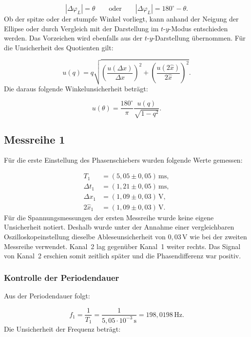 \documentclass{report}
\begin{document}
\begin{equation}
|\Delta\varphi_L|=\theta
\qquad\text{oder}\qquad
|\Delta\varphi_L|=180^\circ-\theta.
\end{equation}
\noindent
Ob der spitze oder der stumpfe Winkel vorliegt, kann anhand der Neigung der Ellipse oder durch Vergleich mit der Darstellung im $t$-$y$-Modus entschieden werden. Das Vorzeichen wird ebenfalls aus der $t$-$y$-Darstellung übernommen.
\noindent
Für die Unsicherheit des Quotienten gilt:

\begin{equation}
u(q)
=
q
\sqrt{
\left(\frac{u(\Delta x)}{\Delta x}\right)^2
+
\left(\frac{u(2\hat{x})}{2\hat{x}}\right)^2
}.
\label{eq:q_uncertainty}
\end{equation}
\noindent
Die daraus folgende Winkelunsicherheit beträgt:

\begin{equation}
\boxed{
u(\theta)
=
\frac{180^\circ}{\pi}
\frac{u(q)}{\sqrt{1-q^2}}
}.
\label{eq:lissajous_uncertainty}
\end{equation}

\subsection{Messreihe 1}
\noindent
Für die erste Einstellung des Phasenschiebers wurden folgende Werte gemessen:

\begin{align}
T_1&=(5{,}05\pm0{,}05)\,\mathrm{ms},\\
\Delta t_1&=(1{,}21\pm0{,}05)\,\mathrm{ms},\\
\Delta x_1&=(1{,}09\pm0{,}03)\,\mathrm{V},\\
2\hat{x}_1&=(1{,}09\pm0{,}03)\,\mathrm{V}.
\end{align}
\noindent
Für die Spannungsmessungen der ersten Messreihe wurde keine eigene Unsicherheit notiert. Deshalb wurde unter der Annahme einer vergleichbaren Oszilloskopeinstellung dieselbe Ableseunsicherheit von $0{,}03\,\mathrm{V}$ wie bei der zweiten Messreihe verwendet.
\noindent
Kanal~2 lag gegenüber Kanal~1 weiter rechts. Das Signal von Kanal~2 erschien somit zeitlich später und die Phasendifferenz war positiv.

\subsubsection{Kontrolle der Periodendauer}
\noindent
Aus der Periodendauer folgt:

\begin{equation}
f_1=\frac{1}{T_1}
=
\frac{1}{5{,}05\cdot10^{-3}\,\mathrm{s}}
=
198{,}0198\,\mathrm{Hz}.
\end{equation}
\noindent
Die Unsicherheit der Frequenz beträgt:
\end{document}
